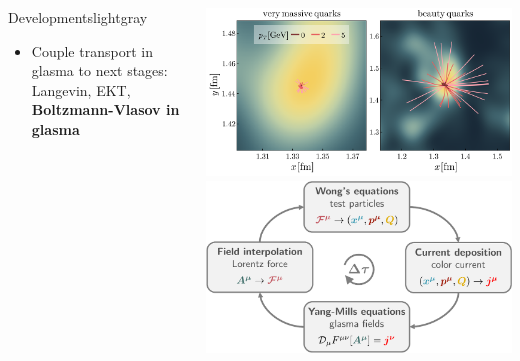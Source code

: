 \documentclass[aspectratio=169,11pt,usenames,dvipsnames]{beamer}
\renewcommand{\thefootnote}{\color{customblue}\faPaperPlaneO}
\newcommand\blfootnote[1]{%
  \begingroup
  \renewcommand\thefootnote{}\footnote{#1}%
  \addtocounter{footnote}{-1}%
  \endgroup
}
\begin{document}
\begin{frame}
\begin{center}
\begin{columns}
\begin{center}
\begin{custombox2}{Developments}{lightgray}
\begin{varwidth}{\textwidth}
\begin{itemize}
                        \item Couple transport in glasma to next stages: Langevin, EKT, {\bfseries\color{jyured} Boltzmann-Vlasov in glasma}
                    \end{itemize}
                    \end{varwidth}
                \end{custombox2}
            \end{center}
                \vspace{10pt}
                \begin{center}\includegraphics[width=\columnwidth]{images/hqs_flux_tubes.png}\\[5pt]
                    \includegraphics[width=\columnwidth]{images/cpic.pdf}\end{center}
        \end{columns}
    \end{center}

\end{frame}
\end{document}
